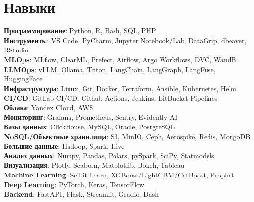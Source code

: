 \section{Навыки}
\begin{itemize}[leftmargin=0.15in, label={}]
  {\item{
        \textbf{Программирование}{: Python, R, Bash, SQL, PHP} \\
        \textbf{Инструменты}{: VS Code, PyCharm, Jupyter Notebook/Lab, DataGrip, dbeaver, RStudio} \\
        \textbf{MLOps}{: MLflow, ClearML, Prefect, Airflow, Argo Workflows, DVC, WandB} \\
        \textbf{LLMOps}{: vLLM, Ollama, Triton, LangChain, LangGraph, LangFuse, HuggingFace} \\
        \textbf{Инфраструктура}{: Linux, Git, Docker, Terraform, Ansible, Kubernetes, Helm} \\
        \textbf{CI/CD}{: GitLab CI/CD, Github Actions, Jenkins, BitBucket Pipelines} \\
        \textbf{Облака}{: Yandex Cloud, AWS} \\
        \textbf{Мониторинг}{: Grafana, Prometheus, Sentry, Evidently AI} \\
        \textbf{Базы данных}{: ClickHouse, MySQL, Oracle, PostgreSQL} \\
        \textbf{NoSQL/Объектные хранилища}{: S3, MinIO, Ceph, Aerospike, Redis, MongoDB} \\
        \textbf{Большие данные}{: Hadoop, Spark, Hive} \\
        \textbf{Анализ данных}{: Numpy, Pandas, Polars, pySpark, SciPy, Statmodels} \\
        \textbf{Визуализация}{: Plotly, Seaborn, Matplotlib, Bokeh, Tableau} \\
        \textbf{Machine Learning}{: Scikit-Learn, XGBoost/LightGBM/CatBoost, Prophet} \\
        \textbf{Deep Learning}{: PyTorch, Keras, TensorFlow} \\
        \textbf{Backend}{: FastAPI, Flask, Streamlit, Gradio, Dash} \\
        }}
\end{itemize}